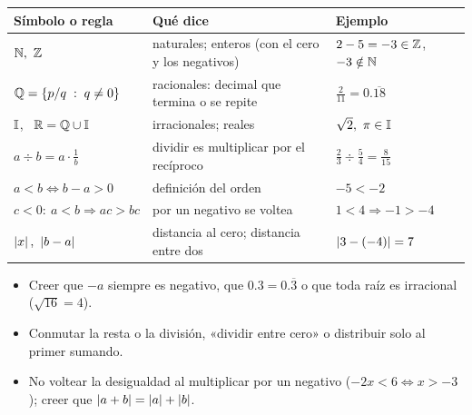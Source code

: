 \documentclass[11pt,a4paper]{article}
\newcommand{\per}[1]{\overline{#1}}
\begin{document}
\repaso
\begin{center}\small
\begin{tabularx}{\linewidth}{@{}>{\centering\arraybackslash}p{42mm} L >{\raggedright\arraybackslash}p{40mm}@{}}
\toprule
Símbolo o regla & Qué dice & Ejemplo\\ \midrule
$\mathbb{N},\ \mathbb{Z}$ & naturales; enteros (con el cero y los negativos) & $2-5=-3\in\mathbb{Z}$, \ $-3\notin\mathbb{N}$\\
$\mathbb{Q}=\{p/q\;:\; q\neq0\}$ & racionales: decimal que termina o se repite & $\tfrac{2}{11}=0.\per{18}$\\
$\mathbb{I}$, \ $\mathbb{R}=\mathbb{Q}\cup\mathbb{I}$ & irracionales; reales & $\sqrt2,\ \pi\in\mathbb{I}$\\
$a\div b=a\cdot\frac1b$ & dividir es multiplicar por el recíproco & $\tfrac23\div\tfrac54=\tfrac{8}{15}$\\
$a<b\iff b-a>0$ & definición del orden & $-5<-2$\\
$c<0:\ a<b\Rightarrow ac>bc$ & por un negativo se voltea & $1<4\Rightarrow -1>-4$\\
$\left\lvert x\right\rvert,\ \left\lvert b-a\right\rvert$ & distancia al cero; distancia entre dos & $\left\lvert 3-(-4)\right\rvert=7$\\
\bottomrule
\end{tabularx}
\end{center}

\begin{ojo}
\begin{itemize}
\item Creer que $-a$ siempre es negativo, que $0.3=0.\per3$ o que toda raíz es irracional ($\sqrt{16}=4$).
\item Conmutar la resta o la división, «dividir entre cero» o distribuir solo al primer sumando.
\item No voltear la desigualdad al multiplicar por un negativo ($-2x<6\iff x>-3$); creer que $\left\lvert a+b\right\rvert=\left\lvert a\right\rvert+\left\lvert b\right\rvert$.
\end{itemize}
\end{ojo}
\end{document}
